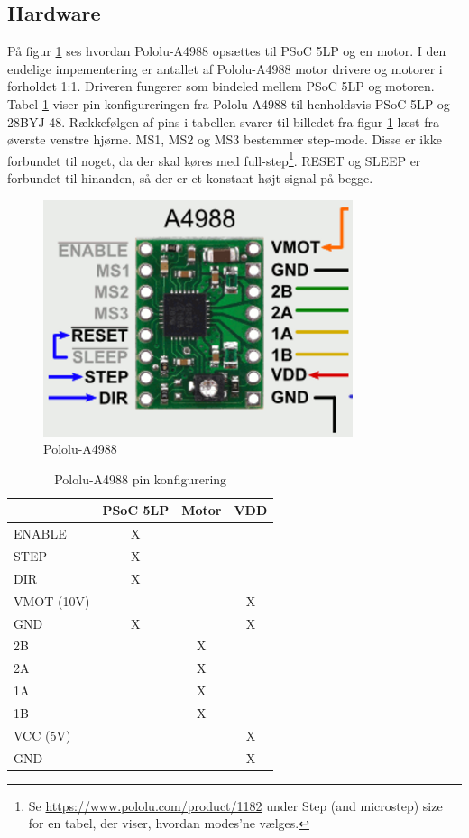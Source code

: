 \subsection{Hardware}
\label{HW_Implementering}
På figur \ref{fig:Pololu-A4988} ses hvordan Pololu-A4988 opsættes til PSoC 5LP og en motor. I den endelige impementering er antallet af Pololu-A4988 motor drivere og motorer i forholdet 1:1. Driveren fungerer som bindeled mellem PSoC 5LP og motoren. Tabel \ref{tab:Pololu-A4988_pin_configuration} viser pin konfigureringen fra Pololu-A4988 til henholdsvis PSoC 5LP og 28BYJ-48. Rækkefølgen af pins i tabellen svarer til billedet fra figur \ref{fig:Pololu-A4988} læst fra øverste venstre hjørne. MS1, MS2 og MS3 bestemmer step-mode. Disse er ikke forbundet til noget, da der skal køres med full-step\footnote{Se \url{https://www.pololu.com/product/1182} under Step (and microstep) size for en tabel, der viser, hvordan modes'ne vælges.}. RESET og SLEEP er forbundet til hinanden, så der er et konstant højt signal på begge.

\begin{figure}[H]
	\centerline{\includegraphics[scale=0.6]{tex/Implementering/Implementering_til_projektrapport/Pololu-A4988.png}}
	\caption{Pololu-A4988}
	\label{fig:Pololu-A4988}
\end{figure}

\begin{table}[H]
  \centering
\begin{tabular}{ |l|c|c|c| }
  \hline
   & \textbf{PSoC 5LP} & \textbf{Motor} & \textbf{VDD} \\
  \hline 
  ENABLE & X & & \\
  \hline
  STEP & X & & \\
  \hline
  DIR & X & & \\
  \hline
  VMOT (10V) & & & X \\
  \hline
  GND & X & & X \\
  \hline
  2B & & X & \\
  \hline
  2A & & X & \\
  \hline
  1A & & X & \\
  \hline
  1B & & X & \\
  \hline
  VCC (5V) & & & X \\
  \hline
  GND & & & X \\
  \hline
\end{tabular}
\caption{Pololu-A4988 pin konfigurering}\label{tab:Pololu-A4988_pin_configuration}
\end{table}

